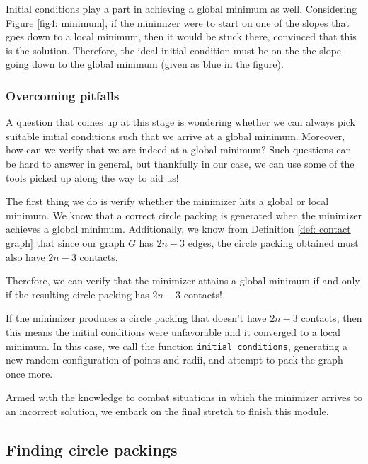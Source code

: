 \vspace{-4mm}
\begin{flushleft}
Initial conditions play a part in achieving a global minimum as well. Considering Figure \ref{fig4: minimum}, if the minimizer were to start on one of the slopes that goes down to a local minimum, then it would be stuck there, convinced that this is the solution. Therefore, the ideal initial condition must be on the the slope going down to the global minimum (given as blue in the figure).
\end{flushleft}

\subsubsection{Overcoming pitfalls}

\begin{flushleft}
A question that comes up at this stage is wondering whether we can always pick suitable initial conditions such that we arrive at a global minimum. Moreover, how can we verify that we are indeed at a global minimum? Such questions can be hard to answer in general, but thankfully in our case, we can use some of the tools picked up along the way to aid us!
\end{flushleft}

\begin{flushleft}
The first thing we do is verify whether the minimizer hits a global or local minimum. We know that a correct circle packing is generated when the minimizer achieves a global minimum. Additionally, we know from Definition \ref{def: contact graph} that since our graph $G$ has $2n-3$ edges, the circle packing obtained must also have $2n-3$ contacts. 
\end{flushleft}

\begin{flushleft}
Therefore, we can verify that the minimizer attains a global minimum if and only if the resulting circle packing has $2n-3$ contacts! 
\end{flushleft}

\begin{flushleft}
If the minimizer produces a circle packing that doesn't have $2n-3$ contacts, then this means the initial conditions were unfavorable and it converged to a local minimum. In this case, we call the function \texttt{initial\_conditions}, generating a new random configuration of points and radii, and attempt to pack the graph once more. 
\end{flushleft}

\begin{flushleft}
Armed with the knowledge to combat situations in which the minimizer arrives to an incorrect solution, we embark on the final stretch to finish this module. 
\end{flushleft}

\subsection{Finding circle packings}

\begin{flushleft}

\end{flushleft}